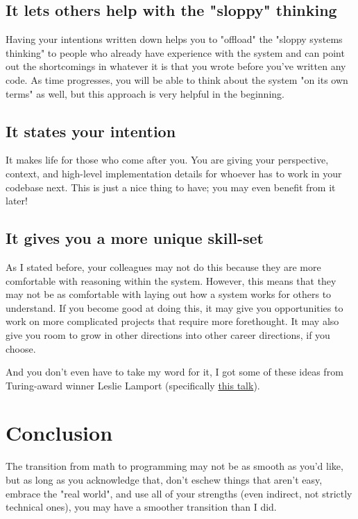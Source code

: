 \documentclass[11pt]{article}
\begin{document}
\subsection*{It lets others help with the "sloppy" thinking}
\label{sec:orge02a9f9}
Having your intentions written down helps you to "offload" the "sloppy systems thinking" to people who already have experience with the system and can point out the shortcomings in whatever it is that you wrote before you've written any code. As time progresses, you will be able to think about the system "on its own terms" as well, but this approach is very helpful in the beginning.

\subsection*{It states your intention}
\label{sec:org98b06e5}
It makes life for those who come after you. You are giving your perspective, context, and high-level implementation details for whoever has to work in your codebase next. This is just a nice thing to have; you may even benefit from it later!

\subsection*{It gives you a more unique skill-set}
\label{sec:org50bdec1}
As I stated before, your colleagues may not do this because they are more comfortable with reasoning within the system. However, this means that they may not be as comfortable with laying out how a system works for others to understand. If you become good at doing this, it may give you opportunities to work on more complicated projects that require more forethought. It may also give you room to grow in other directions into other career directions, if you choose.

And you don't even have to take my word for it, I got some of these ideas from Turing-award winner Leslie Lamport (specifically \href{https://youtu.be/-4Yp3j\_jk8Q?t=135}{this talk}).

\section*{Conclusion}
\label{sec:org4dfaf55}
The transition from math to programming may not be as smooth as you'd like, but as long as you acknowledge that, don't eschew things that aren't easy, embrace the "real world", and use all of your strengths (even indirect, not strictly technical ones), you may have a smoother transition than I did.
\end{document}
